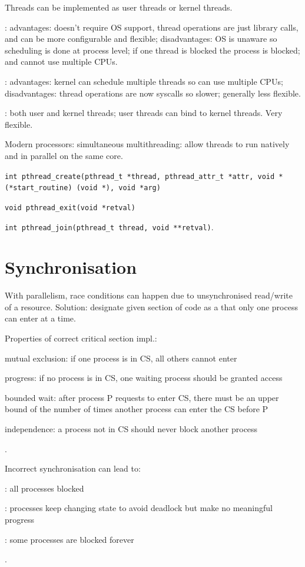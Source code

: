 \documentclass[fontsize=9pt]{slnotes}
\begin{document}
Threads can be implemented as user threads or kernel threads.

: advantages: doesn't require OS support, thread operations are just library calls, and can be more configurable and flexible; disadvantages: OS is unaware so scheduling is done at process level; if one thread is blocked the process is blocked; and cannot use multiple CPUs.

: advantages: kernel can schedule multiple threads so can use multiple CPUs; disadvantages: thread operations are now syscalls so slower; generally less flexible.

: both user and kernel threads; user threads can bind to kernel threads. Very flexible.

Modern processors: simultaneous multithreading: allow threads to run natively and in parallel on the same core.

\texttt{int pthread\_create(pthread\_t *thread, pthread\_attr\_t *attr, void *(*start\_routine) (void *), void *arg)}

\texttt{void pthread\_exit(void *retval)}

\texttt{int pthread\_join(pthread\_t thread, void **retval)}.

\chapter{Synchronisation}
With parallelism, race conditions can happen due to unsynchronised read/write of a resource. Solution: designate given section of code as a  that only one process can enter at a time.

Properties of correct critical section impl.: \begin{slinenum}
\item mutual exclusion: if one process is in CS, all others cannot enter
\item progress: if no process is in CS, one waiting process should be granted access
\item bounded wait: after process P requests to enter CS, there must be an upper bound of the number of times another process can enter the CS before P
\item independence: a process not in CS should never block another process
\end{slinenum}.

Incorrect synchronisation can lead to: \begin{slinenumor}
\item {}: all processes blocked
\item {}: processes keep changing state to avoid deadlock but make no meaningful progress
\item {}: some processes are blocked forever
\end{slinenumor}.
\end{document}
